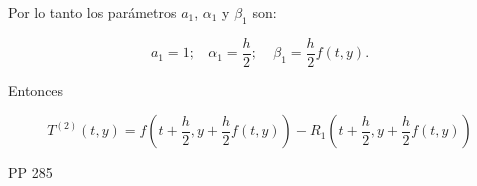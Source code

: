 Por lo tanto los parámetros $a_1$, $\alpha_1$ y $\beta_1$ son:

\begin{equation*}
    a_1=1; \ \ \ \ \alpha_1=\frac{h}{2}; \ \ \ \ \  \beta_1=\frac{h}{2}f(t,y).
\end{equation*}

Entonces

\begin{equation*}
    T^{(2)}(t,y)=f \left(t+ \frac{h}{2},y+\frac{h}{2}f(t,y)\right)-R_1 \left(t+ \frac{h}{2},y+\frac{h}{2}f(t,y)\right)
\end{equation*}

PP 285